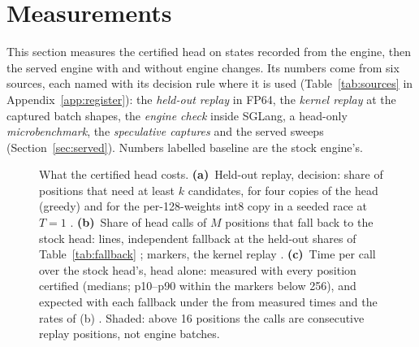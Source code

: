 \section{Measurements}\label{sec:measure}
This section measures the certified head on states recorded from the engine, then the served engine with and without engine changes. Its numbers come from six sources, each named with its decision rule where it is used (Table~\ref{tab:sources} in Appendix~\ref{app:register}): the \emph{held-out replay} in FP64, the \emph{kernel replay} at the captured batch shapes, the \emph{engine check} inside SGLang, a head-only \emph{microbenchmark}, the \emph{speculative captures} and the served sweeps (Section~\ref{sec:served}). Numbers labelled baseline are the stock engine's.

\begin{figure}[t]
\centering
%
\caption{What the certified head costs. \textbf{(a)}~Held-out replay, \Rreal{} decision: share of positions that need at least $k$ candidates, for four copies of the head (greedy) and for the per-128-weights int8 copy in a seeded race at $T=1$ . \textbf{(b)}~Share of head calls of $M$ positions that fall back to the stock head: lines, independent fallback at the held-out shares of Table~\ref{tab:fallback} ; markers, the kernel replay . \textbf{(c)}~Time per call over the stock head's, head alone: measured with every position certified (medians; p10--p90 within the markers below 256), and expected with each fallback under the \modelcons{} from measured times and the rates of (b) . Shaded: above 16 positions the calls are consecutive replay positions, not engine batches.}
\label{fig:candidates}\label{fig:geometry-candidates}
\end{figure}

